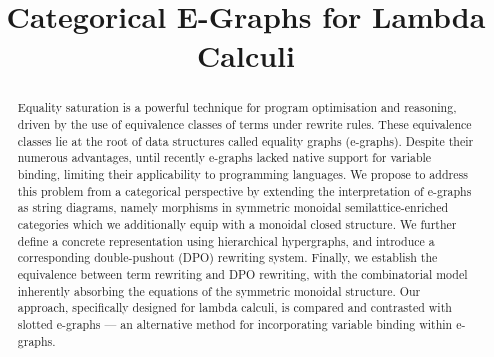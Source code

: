 \documentclass{lmcs}
\title{Categorical E-Graphs for Lambda Calculi}
\begin{document}
\begin{abstract}
	Equality saturation is a powerful technique for program optimisation and reasoning, driven by the use of equivalence classes of terms under rewrite rules.
	These equivalence classes lie at the root of data structures called equality graphs (e-graphs).
	Despite their numerous advantages, until recently e-graphs lacked native support for variable binding, limiting their applicability to programming languages.
	We propose to address this problem from a categorical perspective by extending the interpretation of e-graphs as string diagrams, namely morphisms in symmetric monoidal semilattice-enriched categories which we additionally equip with a monoidal closed structure.
	We further define a concrete representation using hierarchical hypergraphs, and introduce a corresponding double-pushout (DPO) rewriting system.
	Finally, we establish the equivalence between term rewriting and DPO rewriting, with the combinatorial model inherently absorbing the equations of the symmetric monoidal structure.
	Our approach, specifically designed for lambda calculi, is compared and contrasted with slotted e-graphs — an alternative method for incorporating variable binding within e-graphs.
\end{abstract}

\maketitle











\appendix


\end{document}
